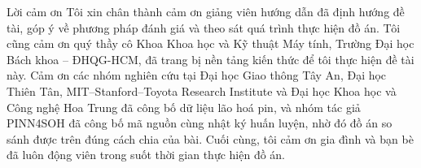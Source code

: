 \begin{preface}{Lời cảm ơn}
  Tôi xin chân thành cảm ơn giảng viên hướng dẫn đã định hướng đề tài, góp ý về phương pháp đánh giá và theo sát quá
  trình thực hiện đồ án. Tôi cũng cảm ơn quý thầy cô Khoa Khoa học và Kỹ thuật Máy tính, Trường Đại học Bách khoa --
  ĐHQG-HCM, đã trang bị nền tảng kiến thức để tôi thực hiện đề tài này. Cảm ơn các nhóm nghiên cứu tại Đại học Giao thông
  Tây An, Đại học Thiên Tân, MIT--Stanford--Toyota Research Institute và Đại học Khoa học và Công nghệ Hoa Trung đã công bố
  dữ liệu lão hoá pin, và nhóm tác giả PINN4SOH đã công bố mã nguồn cùng nhật ký huấn luyện, nhờ đó đồ án so sánh được
  trên đúng cách chia của bài. Cuối cùng, tôi cảm ơn gia đình và bạn bè đã luôn động viên trong suốt thời gian thực hiện đồ án.
\end{preface}
